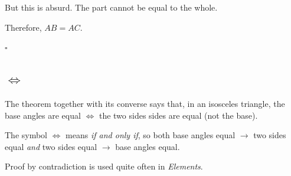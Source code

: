 \documentclass[11pt, oneside]{article}
\begin{document}
But this is absurd.  The part cannot be equal to the whole.

Therefore, $AB = AC$.

$\square$

\subsection*{$\iff$}

The theorem together with its converse says that, in an isosceles triangle, the base angles are equal $\iff$ the two sides sides are equal (not the base).  

The symbol $\iff$ means \emph{if and only if}, so both base angles equal $\rightarrow$ two sides equal  \emph{and} two sides equal $\rightarrow$ base angles equal.

Proof by contradiction is used quite often in \emph{Elements}.
\end{document}
